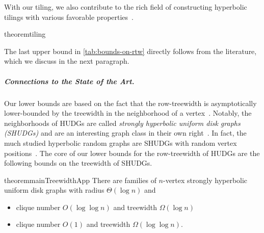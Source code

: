 %
With our tiling, we also contribute to the rich field of constructing hyperbolic tilings with various favorable properties~\cite{Tesselations_Coxeter97,physics_Thurn25,datta_semi_2019}.
\begin{restatable}{theorem}{tiling}\label{lem:tiling}
%
\end{restatable}
%
The last upper bound in \cref{tab:bounds-on-rtw} directly follows from the literature, which we discuss in the next paragraph.
%
\subparagraph{Connections to the State of the Art.}
%
Our lower bounds are based on the fact that the row-treewidth is asymptotically lower-bounded by the treewidth in the neighborhood of a vertex~\cite{dujmovic_layered_2017}.
Notably, the neighborhoods of HUDGs are called \emph{strongly hyperbolic uniform disk graphs (SHUDGs)} and are an interesting graph class in their own right~\cite{blasius_strongly_2023}.
In fact, the much studied hyperbolic random graphs are SHUDGs with random vertex positions~\cite{krioukov_hyperbolic_2010}.
The core of our lower bounds for the row-treewidth of HUDGs are the following bounds on the treewidth of SHUDGs.
%
\begin{restatable}{theorem}{mainTreewidthApp}\label{main:treewidth}
    There are families of $ n $-vertex strongly hyperbolic uniform disk graphs with radius $\Theta(\log n)$ and
    \begin{itemize}
        \item clique number $ O(\log \log n) $ and treewidth $ \Omega(\log n) $
        \item clique number $ O(1) $ and treewidth $ \Omega(\log \log n) $.
    \end{itemize}
%
\end{restatable}
